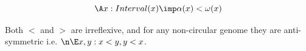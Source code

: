\documentclass{article}
\def\upstreamOf{\pr{upstream\_of}}
\begin{document}
$$
\A x : Interval(x) \imp \alpha(x) < \omega(x)
$$

Both $<$ and $>$ are irreflexive, and for any non-circular genome they
are anti-symmetric i.e. $\n \E x,y : x<y, y<x$.



\end{document}
